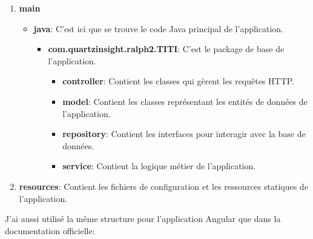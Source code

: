 \documentclass[a4paper, 11pt]{report}
\begin{document}
\begin{enumerate}
\def\labelenumi{\arabic{enumi}.}
\tightlist
\item
  \textbf{main}

  \begin{itemize}
  \tightlist
  \item
    \textbf{java}: C'est ici que se trouve le code Java principal de
    l'application.

    \begin{itemize}
    \tightlist
    \item
      \textbf{com.quartzinsight.ralph2.TITI}: C'est le package de base
      de l'application.

      \begin{itemize}
      \tightlist
      \item
        \textbf{controller}: Contient les classes qui gèrent les
        requêtes HTTP.
      \item
        \textbf{model}: Contient les classes représentant les entités de
        données de l'application.
      \item
        \textbf{repository}: Contient les interfaces pour interagir avec
        la base de données.
      \item
        \textbf{service}: Contient la logique métier de l'application.
      \end{itemize}
    \end{itemize}
  \end{itemize}
\item
  \textbf{resources}: Contient les fichiers de configuration et les
  ressources statiques de l'application.
\end{enumerate}

J'ai aussi utilisé la même structure pour l'application Angular que dans
la documentation officielle:
\end{document}
